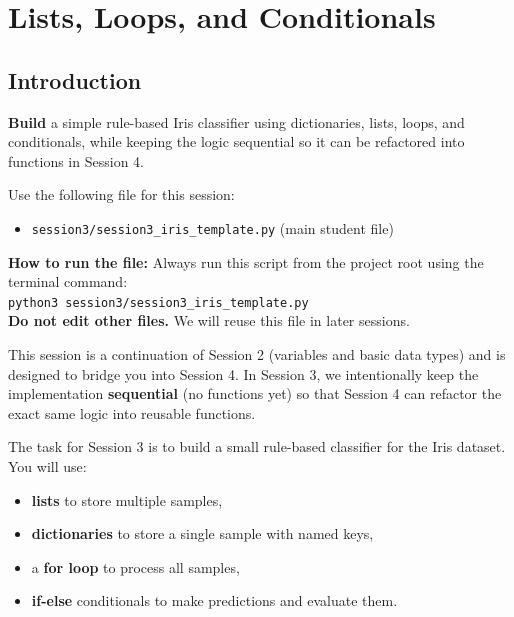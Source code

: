 \chapter{Lists, Loops, and Conditionals}

\section{Introduction}

\begin{tcolorbox}[title=Goal]
\textbf{Build} a simple rule-based Iris classifier using dictionaries, lists, loops, and conditionals, while keeping the logic sequential so it can be refactored into functions in Session 4.
\end{tcolorbox}

\begin{tcolorbox}[title=You will work in]
Use the following file for this session:
\begin{itemize}
    \item \texttt{session3/session3\_iris\_template.py} (main student file)
\end{itemize}
\textbf{How to run the file:} Always run this script from the project root using the terminal command: \\
\texttt{python3 session3/session3\_iris\_template.py} \\
\textbf{Do not edit other files.} We will reuse this file in later sessions.
\end{tcolorbox}

This session is a continuation of Session 2 (variables and basic data types) and is designed to bridge you into Session 4.
In Session 3, we intentionally keep the implementation \textbf{sequential} (no functions yet) so that Session 4 can refactor the exact same logic into reusable functions.

The task for Session 3 is to build a small rule-based classifier for the Iris dataset. You will use:
\begin{itemize}
    \item \textbf{lists} to store multiple samples,
    \item \textbf{dictionaries} to store a single sample with named keys,
    \item a \textbf{for loop} to process all samples,
    \item \textbf{if-else} conditionals to make predictions and evaluate them.
\end{itemize}

